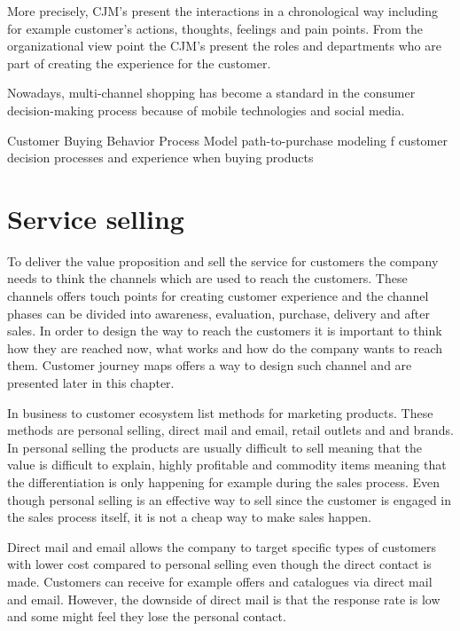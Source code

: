 More precisely, CJM's present the interactions in a chronological way including for example customer's actions, thoughts, feelings and pain points. From the organizational view point the CJM's present the roles and departments who are part of creating the experience for the customer. \parencite{Kalbach:2016}

Nowadays, multi-channel shopping has become a standard in the consumer decision-making process because of mobile technologies and social media. 

Customer Buying Behavior Process Model
path-to-purchase modeling
f customer decision processes and
experience when buying products

\section{Service selling}

To deliver the value proposition and sell the service for customers the company needs to think the channels which are used to reach the customers. These channels offers touch points for creating customer experience and the channel phases can be divided into awareness, evaluation, purchase, delivery and after sales. In order to design the way to reach the customers it is important to think how they are reached now, what works and how do the company wants to reach them. \parencite{BusinessModelGeneration:2010} Customer journey maps offers a way to design such channel and are presented later in this chapter.

In business to customer ecosystem \textcite{MarketingPlans:2016} list methods for marketing products. These methods are personal selling, direct mail and email, retail outlets and and brands. In personal selling the products are usually difficult to sell meaning that the value is difficult to explain, highly profitable and commodity items meaning that the differentiation is only happening for example during the sales process. Even though personal selling is an effective way to sell since the customer is engaged in the sales process itself, it is not a cheap way to make sales happen.

Direct mail and email allows the company to target specific types of customers with lower cost compared to personal selling even though the direct contact is made. Customers can receive for example offers and catalogues via direct mail and email. However, the downside of direct mail is that the response rate is low and some might feel they lose the personal contact. \parencite{MarketingPlans:2016}

